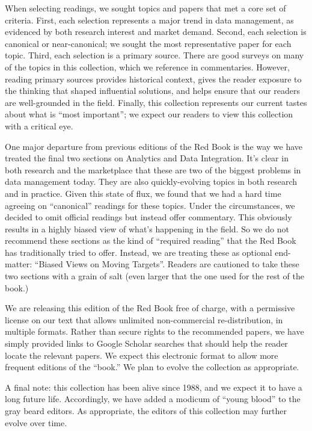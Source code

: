\documentclass[b5paper,11pt,twoside,openright]{book}
\begin{document}
When selecting readings, we sought topics and papers that met a core set
of criteria. First, each selection represents a major trend in data
management, as evidenced by both research interest and market demand.
Second, each selection is canonical or near-canonical; we sought the
most representative paper for each topic. Third, each selection is a
primary source. There are good surveys on many of the topics in this
collection, which we reference in commentaries. However, reading primary
sources provides historical context, gives the reader exposure to the
thinking that shaped influential solutions, and helps ensure that our
readers are well-grounded in the field. Finally, this collection
represents our current tastes about what is ``most important''; we
expect our readers to view this collection with a critical eye.

One major departure from previous editions of the Red Book is the way we
have treated the final two sections on Analytics and Data Integration.
It's clear in both research and the marketplace that these are two of
the biggest problems in data management today. They are also
quickly-evolving topics in both research and in practice. Given this
state of flux, we found that we had a hard time agreeing on
``canonical'' readings for these topics. Under the circumstances, we
decided to omit official readings but instead offer commentary. This
obviously results in a highly biased view of what's happening in the
field. So we do not recommend these sections as the kind of ``required
reading'' that the Red Book has traditionally tried to offer. Instead,
we are treating these as optional end-matter: ``Biased Views on Moving
Targets''. Readers are cautioned to take these two sections with a grain
of salt (even larger that the one used for the rest of the book.)

We are releasing this edition of the Red Book free of charge, with a
permissive license on our text that allows unlimited non-commercial
re-distribution, in multiple formats. Rather than secure rights to the
recommended papers, we have simply provided links to Google Scholar
searches that should help the reader locate the relevant papers. We
expect this electronic format to allow more frequent editions of the
``book.'' We plan to evolve the collection as appropriate.

A final note: this collection has been alive since 1988, and we expect
it to have a long future life. Accordingly, we have added a modicum of
``young blood'' to the gray beard editors. As appropriate, the editors
of this collection may further evolve over time.
\end{document}
